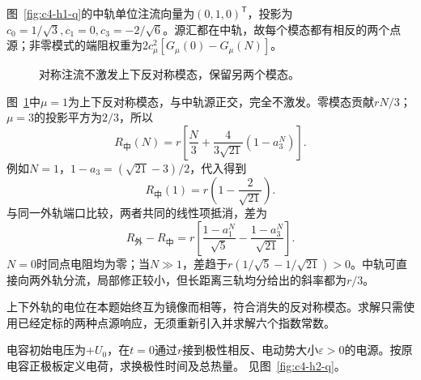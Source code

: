 \begin{solution}
图~\ref{fig:c4-h1-q}的中轨单位注流向量为$(0,1,0)^{\mathsf T}$，投影为$c_0=1/\sqrt3,c_1=0,c_3=-2/\sqrt6$。源汇都在中轨，故每个模态都有相反的两个点源；非零模式的端阻权重为$2c_\mu^2[G_\mu(0)-G_\mu(N)]$。
\begin{figure}[H]\centering
{}
\caption{对称注流不激发上下反对称模态，保留另两个模态。}\label{fig:c4-h1-s}
\end{figure}
图~\ref{fig:c4-h1-s}中$\mu=1$为上下反对称模态，与中轨源正交，完全不激发。零模态贡献$rN/3$；$\mu=3$的投影平方为$2/3$，所以
\[
 \boxed{R_{\text{中}}(N)=r\left[\frac N3+
 \frac4{3\sqrt{21}}(1-a_3^N)\right]}.
\]
例如$N=1$，$1-a_3=(\sqrt{21}-3)/2$，代入得到
\[
 R_{\text{中}}(1)=r\left(1-\frac2{\sqrt{21}}\right).
\]
与同一外轨端口比较，两者共同的线性项抵消，差为
\[
 R_{\text{外}}-R_{\text{中}}
 =r\left[\frac{1-a_1^N}{\sqrt5}
 -\frac{1-a_3^N}{\sqrt{21}}\right].
\]
$N=0$时同点电阻均为零；当$N\gg1$，差趋于$r(1/\sqrt5-1/\sqrt{21})>0$。中轨可直接向两外轨分流，局部修正较小，但长距离三轨均分给出的斜率都为$r/3$。

上下外轨的电位在本题始终互为镜像而相等，符合消失的反对称模态。求解只需使用已经定标的两种点源响应，无须重新引入并求解六个指数常数。
\end{solution}

\begin{exercise}[RC预充电后的反向接通]\label{ex:c4-h2}
电容初始电压为$+U_0$，在$t=0$通过$r$接到极性相反、电动势大小$\varepsilon>0$的电源。按原电容正极板定义电荷，求换极性时间及总热量。 见图~\ref{fig:c4-h2-q}。
\end{exercise}

